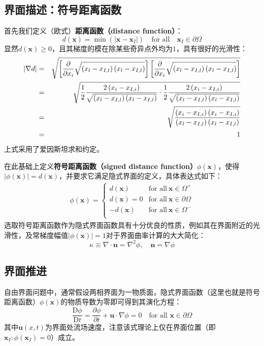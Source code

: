 \documentclass[11pt]{article}
\begin{document}
\subsection{界面描述：符号距离函数}
首先我们定义（欧式）\textbf{距离函数（distance function）}：
\begin{equation}
    d(\bm{x})=\min\left(\left|\bm{x}-\bm{x}_I\right|\right)\quad\text{for all}\quad \bm{x}_I\in\partial\Omega
\end{equation}
显然$d(\bm{x})\geq0$，且其梯度的模在除某些奇异点外均为$1$，具有很好的光滑性：
\begin{eqnarray}
    \left|\nabla d\right| &=& \sqrt{\left[\frac{\partial}{\partial x_i}\sqrt{\left(x_l-x_{I,l}\right)\left(x_l-x_{I,l}\right)}\right]\left[\frac{\partial}{\partial x_i}\sqrt{\left(x_l-x_{I,l}\right)\left(x_l-x_{I,l}\right)}\right]}\notag\\
    &=&\sqrt{\frac{1}{2}\frac{2\left(x_i-x_{I,i}\right)}{\sqrt{\left(x_l-x_{I,l}\right)\left(x_l-x_{I,l}\right)}}\cdot\frac{1}{2}\frac{2\left(x_i-x_{I,i}\right)}{\sqrt{\left(x_l-x_{I,l}\right)\left(x_l-x_{I,l}\right)}}}\notag\\
    &=&\sqrt{\frac{\left(x_i-x_{I,i}\right)\left(x_i-x_{I,i}\right)}{\left(x_l-x_{I,l}\right)\left(x_l-x_{I,l}\right)}}\notag\\
    &=&1
\end{eqnarray}
上式采用了爱因斯坦求和约定。

在此基础上定义\textbf{符号距离函数（signed distance function）}$\phi(\bm{x})$，使得$|\phi(\bm{x})|=d(\bm{x})$，并要求它满足隐式界面的定义，具体表达式如下：
\begin{eqnarray}
    \phi(\bm{x})=\left\{\begin{array}{rl}
        d(\bm{x})   & \text{for all}\ \bm{x}\in\Omega^+       \\
        d(\bm{x})=0 & \text{for all}\ \bm{x}\in\partial\Omega \\
        -d(\bm{x})  & \text{for all}\ \bm{x}\in\Omega^-       \\
    \end{array}\right.
    \label{eqn:sdf}
\end{eqnarray}
选取符号距离函数作为隐式界面函数具有十分优良的性质，例如其在界面附近的光滑性，及常梯度幅值$\left|\phi(\bm{x})\right|=1$对于界面曲率计算的大大简化：
\begin{equation}
    \kappa\equiv\nabla\cdot\bm{n}=\nabla^2\phi,\quad \bm{n}=\nabla\phi
\end{equation}

\subsection{界面推进}
自由界面问题中，通常假设两相界面为一物质面，隐式界面函数（这里也就是符号距离函数）$\phi(\bm{x})$的物质导数为零即可得到其演化方程：
\begin{equation}
    \frac{\mathrm{D}\phi}{\mathrm{D}t}=\frac{\partial\phi}{\partial t}+\bm{u}\cdot\nabla\phi=0\quad\text{for all }\bm{x}\in\partial\Omega
    \label{eqn:evolution}
\end{equation}
其中$\bm{u}(x,t)$为界面处流场速度，注意该式理论上仅在界面位置（即$\bm{x}_I:\phi(\bm{x}_I)=0$）成立。
\end{document}

